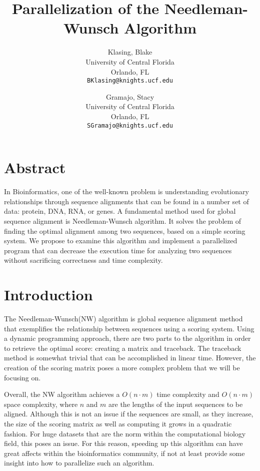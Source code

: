\documentclass[letterpaper, 10 pt, conference]{IEEEconf}
\begin{document}
\title{\LARGE\bfseries Parallelization of the Needleman-Wunsch Algorithm}

\author{
	Klasing, Blake\\
	University of Central Florida \\
	Orlando, FL \\
	\texttt{BKlasing@knights.ucf.edu}
	\and
	Gramajo, Stacy\\
	University of Central Florida \\
	Orlando, FL \\
	\texttt{SGramajo@knights.ucf.edu} \\
	}
\maketitle
\section{Abstract}

In Bioinformatics, one of the well-known problem is understanding evolutionary relationships through sequence alignments that can be found in a number set of data: protein, DNA, RNA, or genes. A fundamental method used for global sequence alignment is Needleman-Wunsch algorithm. It solves the problem of finding the optimal alignment among two sequences, based on a simple scoring system. We propose to examine this algorithm and implement a parallelized program that can decrease the execution time for analyzing two sequences without sacrificing correctness and time complexity.


\section{Introduction}

The Needleman-Wunsch(NW) algorithm is global sequence alignment method that exemplifies the relationship between sequences using a scoring system. Using a dynamic programming approach, there are two parts to the algorithm in order to retrieve the optimal score: creating a matrix and traceback. The traceback method is somewhat trivial that can be accomplished in linear time. However, the creation of the scoring matrix poses a more complex problem that we will be focusing on. 

Overall, the NW algorithm achieves a $O(n\cdot m)$ time complexity and $O(n\cdot m)$ space complexity, where $n$ and $m$ are the lengths of the input sequences to be aligned. Although this is not an issue if the sequences are small, as they increase, the size of the scoring matrix as well as computing it grows in a quadratic fashion. For huge datasets that are the norm within the computational biology field, this poses an issue. For this reason, speeding up this algorithm can have great affects within the bioinformatics community, if not at least provide some insight into how to parallelize such an algorithm. 
\end{document}
